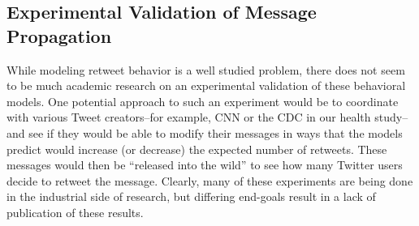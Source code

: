 \subsection{Experimental Validation of Message Propagation}
While modeling retweet behavior is a well studied problem, there does not seem to be much academic research on an experimental validation of these behavioral models. One potential approach to such an experiment would be to coordinate with various Tweet creators--for example, CNN or the CDC in our health study--and see if they would be able to modify their messages in ways that the models predict would increase (or decrease) the expected number of retweets. These messages would then be ``released into the wild'' to see how many Twitter users decide to retweet the message. Clearly, many of these experiments are being done in the industrial side of research, but differing end-goals result in a lack of publication of these results. 
